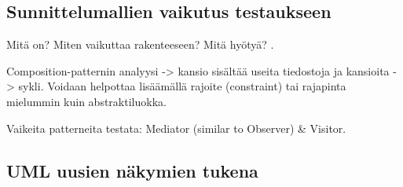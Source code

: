 \documentclass[finnish]{tktltiki2}
\theoremstyle{definition}
\theoremstyle{remark}
\begin{document}





\subsection{Sunnittelumallien vaikutus testaukseen}

Mitä on? Miten vaikuttaa rakenteeseen? Mitä  hyötyä? \citep{baudry_measuring_2003}.


Composition-patternin analyysi -> kansio sisältää useita tiedostoja ja kansioita -> sykli. Voidaan helpottaa lisäämällä rajoite (constraint) tai rajapinta mielummin kuin abstraktiluokka. 

Vaikeita patterneita testata: Mediator (similar to Observer) \& Visitor.

\subsection{UML uusien näkymien tukena}

\end{document}
